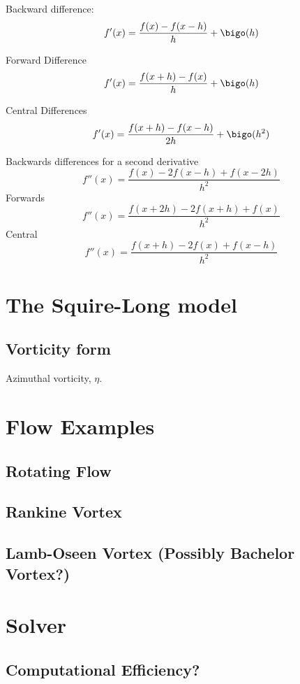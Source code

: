 \documentclass{X:/Documents/Coding/Latex/myreport}
\theoremstyle{plain}
\theoremstyle{definition}
\theoremstyle{remark}
\numberwithin{equation}{section}
\numberwithin{figure}{section}
\begin{document}
Backward difference:
\[f'(x) = \frac{f(x) - f(x-h)}{h} + \bigo(h)\]

Forward Difference
\[f'(x) = \frac{f(x+h) - f(x)}{h}+ \bigo(h)\]

Central Differences
\[f'(x) = \frac{f(x+h) - f(x-h)}{2h}+ \bigo(h^2)\]

Backwards differences for a second derivative
\[f''(x) = \frac{f(x) - 2f(x-h) + f(x-2h)}{h^2}\]
Forwards
\[f''(x) = \frac{f(x+2h) - 2f(x+h) + f(x)}{h^2}\]
Central 
\[f''(x) = \frac{f(x+h) - 2 f(x) + f(x-h)}{h^2}\]
\chapter{The Squire-Long model}

\section{Vorticity form}
Azimuthal vorticity, $\eta$.
\chapter{Flow Examples}
\section{Rotating Flow}
\section{Rankine Vortex}
\section{Lamb-Oseen Vortex (Possibly Bachelor Vortex?)}

\chapter{Solver}

\section{Computational Efficiency?}
\end{document}
